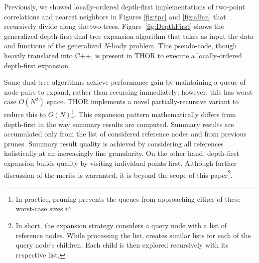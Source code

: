\documentclass[twoside,leqno,twocolumn]{article}
\newcommand{\fig}[1]{Figure~\ref{fig:#1}}
\begin{document}
Previously, we showed locally-ordered depth-first implementations of two-point correlations and nearest neighbors in Figures \ref{fig:tpc} and \ref{fig:allnn} that recursively divide along the two trees.
\fig{DepthFirst} shows the generalized depth-first dual-tree expansion algorithm that takes as input the data and functions of the generalized $N$-body problem.
This pseudo-code, though heavily translated into C++, is present in THOR to execute a locally-ordered depth-first expansion.

Some dual-tree algorithms achieve performance gain by maintaining a queue of node pairs to expand, rather than recursing immediately; however, this has worst-case $O(N^2)$ space.
THOR implements a novel partially-recursive variant to reduce this to $O(N)$\footnote{
  In practice, pruning prevents the queues from approaching either of these worst-case sizes.}.
This expansion pattern mathematically differs from depth-first in the way summary results are computed.
Summary results are accumulated only from the list of considered reference nodes and from previous prunes.
Summary result quality is achieved by considering all references holistically at an increasingly fine granularity.
On the other hand, depth-first expansion builds quality by visiting individual points first.
Although further discussion of the merits is warranted, it is beyond the scope of this paper\footnote{
  In short, the expansion strategy considers a query node with a list of reference nodes.
  While processing the list, creates similar lists for each of the query node's children.
  Each child is then explored recursively with its respective list.}.
\end{document}
